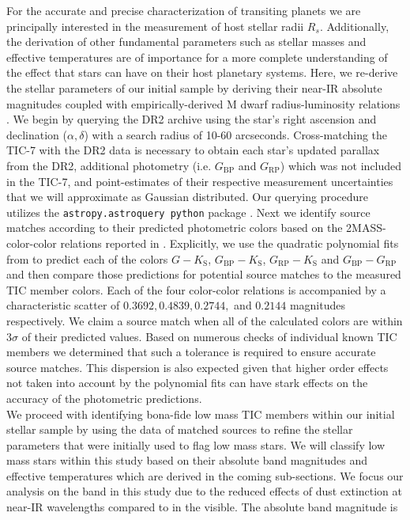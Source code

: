 For the accurate and precise characterization of transiting planets we are principally
interested in the measurement of host stellar radii $R_s$. Additionally, the derivation of other fundamental
parameters such as stellar masses and effective temperatures are of importance for a more complete understanding
of the effect that stars can have on their host planetary systems. Here, we re-derive
the stellar parameters of our initial sample by deriving their near-IR absolute magnitudes coupled with
empirically-derived M dwarf radius-luminosity relations \citep{mann15}. We begin by querying the \gaia{} DR2
archive using the star's right ascension and declination ($\alpha,\delta$) with a search radius of 10-60 arcseconds.
Cross-matching the TIC-7 with the \gaia{} DR2 data is necessary to obtain each star's updated parallax from the DR2,
additional \gaia{} photometry (i.e. $G_{\text{BP}}$ and $G_{\text{RP}}$) which was not included in the TIC-7,
and point-estimates of their respective measurement uncertainties that we will approximate as Gaussian distributed.
Our querying procedure utilizes the \texttt{astropy.astroquery python} package \citep{ginsburg17}.
Next we identify source matches according to their predicted photometric colors based on the 2MASS-\gaia{}
color-color relations reported in \cite{evans18}. Explicitly, we use the quadratic polynomial fits from
\cite{evans18} to predict each of the colors
$G-K_{\text{S}}$, $G_{\text{BP}}-K_{\text{S}}$, $G_{\text{RP}}-K_{\text{S}}$ and $G_{\text{BP}}-G_{\text{RP}}$ and then compare
those predictions for potential source matches to the measured TIC member colors. Each of the four color-color
relations is accompanied by a characteristic scatter of $0.3692, 0.4839, 0.2744,$ and $0.2144$ magnitudes
respectively. We claim a source match when all of the calculated colors are within $3\sigma$ of their predicted
values. Based on numerous checks of individual known TIC members we determined
that such a tolerance is required to ensure accurate source matches. This dispersion is also expected given
that higher order effects not taken into account by the polynomial fits can have stark effects on the accuracy
of the photometric predictions. \\

We proceed with identifying bona-fide low mass TIC members within our initial stellar sample by using the \gaia{} data
of matched sources to refine the stellar parameters that were initially used to flag low mass stars. 
We will classify low mass stars within this study based on their absolute \Ks{-}band magnitudes
\citep{delfosse00,mann15,benedict16} and effective temperatures which are derived in the coming sub-sections.
We focus our analysis on the \Ks{-}band in this study due to the reduced effects of dust
extinction at near-IR wavelengths compared to in the visible. The absolute \Ks{-}band magnitude is

